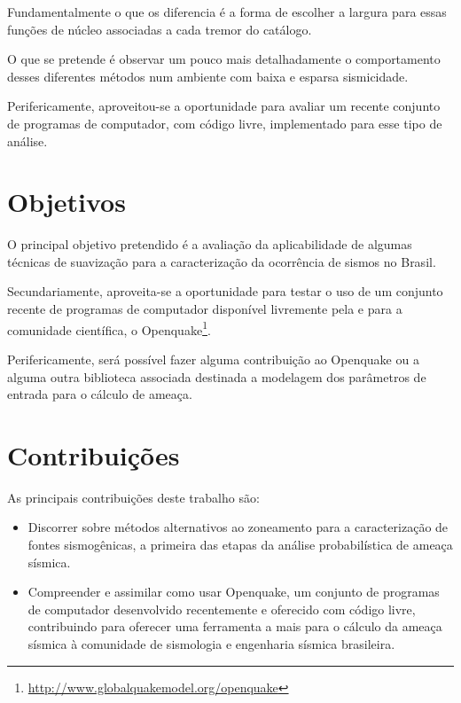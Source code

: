 Fundamentalmente o que os diferencia é a forma de escolher a largura para essas
funções de núcleo associadas a cada tremor do catálogo.

O que se pretende é observar um pouco mais detalhadamente o comportamento
desses diferentes métodos num ambiente com baixa e esparsa sismicidade.

Perifericamente, aproveitou-se a oportunidade para avaliar um recente
conjunto de programas de computador, com código livre, implementado para esse tipo de análise.
 

\section{Objetivos}
\label{sec:objetivo}

O principal objetivo pretendido é a avaliação da
aplicabilidade de algumas técnicas de suavização para a
caracterização da ocorrência de sismos no Brasil.

Secundariamente, aproveita-se a oportunidade para testar o uso de um conjunto
recente de programas de computador disponível livremente pela e para a comunidade
científica, o Openquake\footnote{\url{http://www.globalquakemodel.org/openquake}}. 

Perifericamente, será possível fazer alguma contribuição ao Openquake
ou a alguma outra biblioteca associada destinada a modelagem dos parâmetros de entrada
para o cálculo de ameaça.

\section{Contribuições}
\label{sec:contribucoes}

As principais contribuições deste trabalho são:

\begin{itemize}
  \item Discorrer sobre métodos alternativos ao zoneamento para a caracterização de fontes
  sismogênicas, a primeira das etapas da análise probabilística de ameaça 
  sísmica.

  \item Compreender e assimilar como usar Openquake, um conjunto de programas de
  computador desenvolvido recentemente e oferecido com código livre, contribuindo
  para oferecer uma ferramenta a mais para o cálculo da ameaça sísmica à comunidade
  de sismologia e engenharia sísmica brasileira.
  
\end{itemize}

